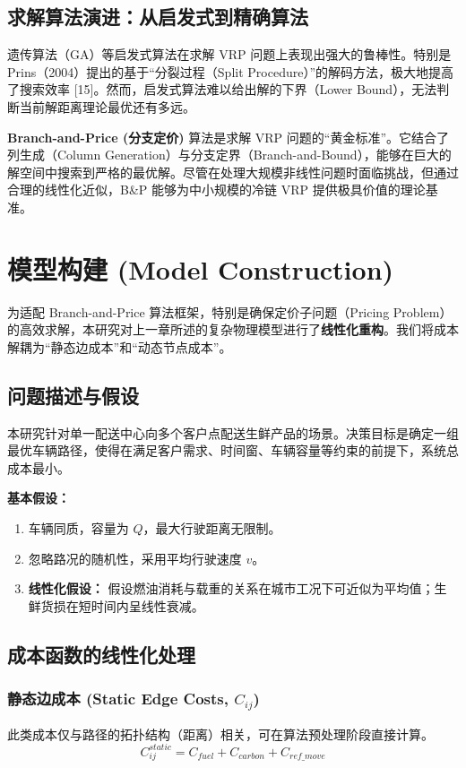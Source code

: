 \documentclass[11pt, a4paper]{article}
\begin{document}
\subsection{求解算法演进：从启发式到精确算法}
遗传算法（GA）等启发式算法在求解 VRP 问题上表现出强大的鲁棒性。特别是 Prins（2004）提出的基于“分裂过程（Split Procedure）”的解码方法，极大地提高了搜索效率 [15]。然而，启发式算法难以给出解的下界（Lower Bound），无法判断当前解距离理论最优还有多远。

\textbf{Branch-and-Price (分支定价)} 算法是求解 VRP 问题的“黄金标准”。它结合了列生成（Column Generation）与分支定界（Branch-and-Bound），能够在巨大的解空间中搜索到严格的最优解。尽管在处理大规模非线性问题时面临挑战，但通过合理的线性化近似，B\&P 能够为中小规模的冷链 VRP 提供极具价值的理论基准。

\section{模型构建 (Model Construction)}

为适配 Branch-and-Price 算法框架，特别是确保定价子问题（Pricing Problem）的高效求解，本研究对上一章所述的复杂物理模型进行了\textbf{线性化重构}。我们将成本解耦为“静态边成本”和“动态节点成本”。

\subsection{问题描述与假设}
本研究针对单一配送中心向多个客户点配送生鲜产品的场景。决策目标是确定一组最优车辆路径，使得在满足客户需求、时间窗、车辆容量等约束的前提下，系统总成本最小。

\textbf{基本假设：}
\begin{enumerate}
    \item 车辆同质，容量为 $Q$，最大行驶距离无限制。
    \item 忽略路况的随机性，采用平均行驶速度 $v$。
    \item \textbf{线性化假设：} 假设燃油消耗与载重的关系在城市工况下可近似为平均值；生鲜货损在短时间内呈线性衰减。
\end{enumerate}

\subsection{成本函数的线性化处理}

\subsubsection{静态边成本 (Static Edge Costs, $C_{ij}$)}
此类成本仅与路径的拓扑结构（距离）相关，可在算法预处理阶段直接计算。
\begin{equation}
C_{ij}^{static} = C_{fuel} + C_{carbon} + C_{ref\_move}
\end{equation}
\end{document}
